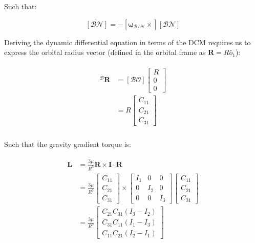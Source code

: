 \documentclass[
]{article}
\begin{document}
Such that:

\[\dot{\left[\mathcal{BN}\right]} = -\left[\boldsymbol{\omega}_\mathcal{B/N}\times\right] \left[\mathcal{BN}\right]\]

Deriving the dynamic differential equation in terms of the DCM requires
us to express the orbital radius vector (defined in the orbital frame as
\(\boldsymbol{R} = R \hat{o}_1\)):

\[\begin{aligned}
\begin{aligned}
    {}^\mathcal{B}\boldsymbol{R} &= \left[\mathcal{BO}\right] \begin{bmatrix} R \\ 0 \\ 0 \end{bmatrix} \\
    &= R \begin{bmatrix} C_{11} \\ C_{21} \\ C_{31} \end{bmatrix} \\
\end{aligned}
\end{aligned}\]

Such that the gravity gradient torque is:

\[\begin{aligned}
\begin{aligned}
    \boldsymbol{L} &= \frac{3\mu}{R^5} \boldsymbol{R} \times \boldsymbol{I} \cdot \boldsymbol{R} \\
    &= \frac{3\mu}{R^3} \begin{bmatrix} C_{11} \\ C_{21} \\ C_{31} \end{bmatrix} \times \begin{bmatrix} I_1 & 0 & 0 \\ 0 & I_2 & 0 \\ 0 & 0 & I_3 \end{bmatrix} \begin{bmatrix} C_{11} \\ C_{21} \\ C_{31} \end{bmatrix} \\
    &= \frac{3\mu}{R^3} \begin{bmatrix} C_{21} C_{31} \left(I_3 - I_2\right) \\ C_{31} C_{11} \left(I_1 - I_3\right) \\ C_{11} C_{21} \left(I_2 - I_1\right) \end{bmatrix} \\
\end{aligned}
\end{aligned}\]
\end{document}
